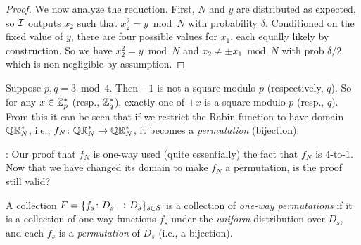 \documentclass[11pt]{article}
\begin{document}
\begin{proof}
  We now analyze the reduction.  First, $N$ and $y$ are distributed as
  expected, so $\mathcal{I}$ outputs $x_{2}$ such that $x_{2}^{2} = y \bmod
  N$ with probability $\delta$.  Conditioned on the fixed value of
  $y$, there are four possible values for $x_{1}$, each equally likely
  by construction.  So we have $x_{2}^{2} = y \bmod N$ and $x_{2} \neq
  \pm x_{1} \bmod N$ with prob $\delta/2$, which is non-negligible by
  assumption.
\end{proof}

Suppose $p,q = 3 \bmod 4$.  Then $-1$ is not a square modulo $p$
(respectively, $q$).  So for any $x \in \mathbb{Z}_p^{*}$ (resp., $\mathbb{Z}_q^{*}$),
exactly one of $\pm x$ is a square modulo $p$ (resp., $q$).  From this
it can be seen that if we restrict the Rabin function to have domain
$\mathbb{QR}_{N}^{*}$, i.e., $f_{N} \colon \mathbb{QR}_{N}^{*} \to \mathbb{QR}_{N}^{*}$, it becomes a
\emph{permutation} (bijection).

\medskip
{}: Our proof that $f_{N}$ is one-way used
(quite essentially) the fact that $f_{N}$ is $4$-to-$1$.  Now that we
have changed its domain to make $f_{N}$ a permutation, is the proof
still valid?

\begin{definition}
  A collection $F = \{f_{s} \colon D_{s} \to D_{s}\}_{s \in S}$ is a
  collection of \emph{one-way permutations} if it is a collection of
  one-way functions $f_{s}$ under the \emph{uniform} distribution over
  $D_{s}$, and each $f_{s}$ is a \emph{permutation} of $D_{s}$ (i.e.,
  a bijection).
\end{definition}
\end{document}

